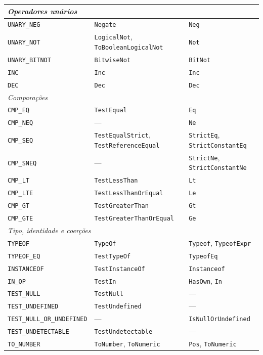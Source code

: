{\begin{longtable}{@{}p{4.2cm}p{5.3cm}p{5.3cm}@{}}
\midrule
\multicolumn{3}{l}{\textit{Operadores unários}} \\
\midrule
\texttt{UNARY\_NEG} & \texttt{Negate} & \texttt{Neg} \\
\texttt{UNARY\_NOT} & \texttt{LogicalNot}, \texttt{ToBooleanLogicalNot} & \texttt{Not} \\
\texttt{UNARY\_BITNOT} & \texttt{BitwiseNot} & \texttt{BitNot} \\
\texttt{INC} & \texttt{Inc} & \texttt{Inc} \\
\texttt{DEC} & \texttt{Dec} & \texttt{Dec} \\
\midrule
\multicolumn{3}{l}{\textit{Comparações}} \\
\midrule
\texttt{CMP\_EQ} & \texttt{TestEqual} & \texttt{Eq} \\
\texttt{CMP\_NEQ} & --- & \texttt{Ne} \\
\texttt{CMP\_SEQ} & \texttt{TestEqualStrict}, \texttt{TestReferenceEqual} & \texttt{StrictEq}, \texttt{StrictConstantEq} \\
\texttt{CMP\_SNEQ} & --- & \texttt{StrictNe}, \texttt{StrictConstantNe} \\
\texttt{CMP\_LT} & \texttt{TestLessThan} & \texttt{Lt} \\
\texttt{CMP\_LTE} & \texttt{TestLessThanOrEqual} & \texttt{Le} \\
\texttt{CMP\_GT} & \texttt{TestGreaterThan} & \texttt{Gt} \\
\texttt{CMP\_GTE} & \texttt{TestGreaterThanOrEqual} & \texttt{Ge} \\
\midrule
\multicolumn{3}{l}{\textit{Tipo, identidade e coerções}} \\
\midrule
\texttt{TYPEOF} & \texttt{TypeOf} & \texttt{Typeof}, \texttt{TypeofExpr} \\
\texttt{TYPEOF\_EQ} & \texttt{TestTypeOf} & \texttt{TypeofEq} \\
\texttt{INSTANCEOF} & \texttt{TestInstanceOf} & \texttt{Instanceof} \\
\texttt{IN\_OP} & \texttt{TestIn} & \texttt{HasOwn}, \texttt{In} \\
\texttt{TEST\_NULL} & \texttt{TestNull} & --- \\
\texttt{TEST\_UNDEFINED} & \texttt{TestUndefined} & --- \\
\texttt{TEST\_NULL\_OR\_UNDEFINED} & --- & \texttt{IsNullOrUndefined} \\
\texttt{TEST\_UNDETECTABLE} & \texttt{TestUndetectable} & --- \\
\texttt{TO\_NUMBER} & \texttt{ToNumber}, \texttt{ToNumeric} & \texttt{Pos}, \texttt{ToNumeric} \\

\end{longtable}}
